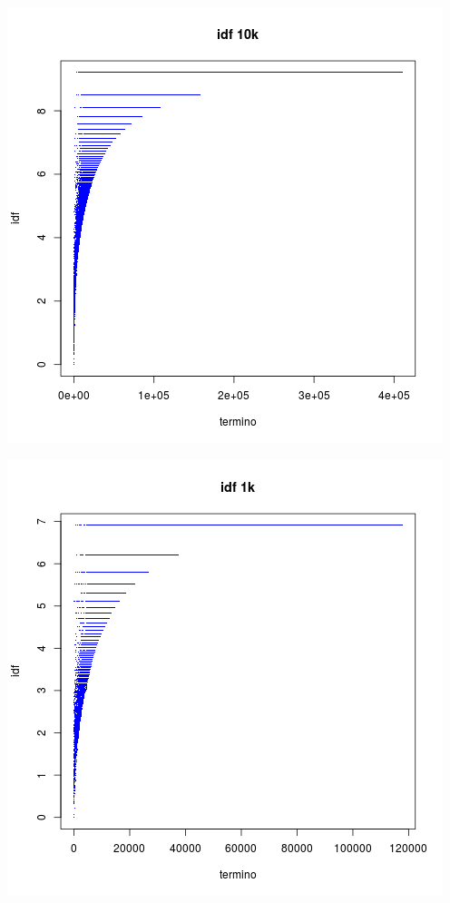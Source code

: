 \begin{center}\includegraphics{img/idf10k.png}
\end{center}
\begin{center}\includegraphics{img/idf1k.png}
\end{center}
